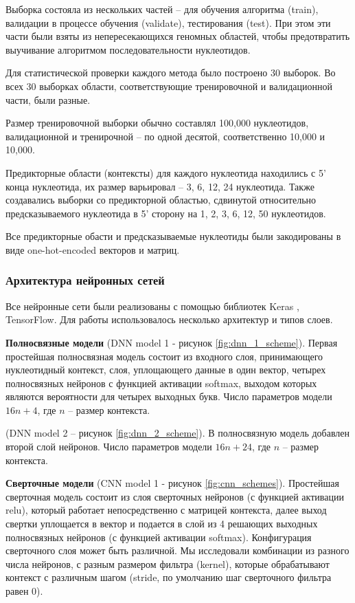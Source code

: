 Выборка состояла из нескольких частей --  для обучения алгоритма (train), валидации в процессе обучения (validate), тестирования (test). При этом эти части были взяты из непересекающихся геномных областей, чтобы предотвратить выучивание алгоритмом последовательности нуклеотидов.

Для статистической проверки каждого метода было построено 30 выборок. Во всех 30 выборках области, соответствующие тренировочной и валидационной части, были разные.

Размер тренировочной выборки обычно составлял 100,000 нуклеотидов, валидационной и тренирочной -- по одной десятой, соответственно 10,000 и 10,000.

Предикторные области (контексты) для каждого нуклеотида находились с 5' конца нуклеотида, их размер варьировал -- 3, 6, 12, 24 нуклеотида. Также создавались выборки со предикторной областью, сдвинутой относительно предсказываемого нуклеотида в 5' сторону на 1, 2, 3, 6, 12, 50 нуклеотидов.

Все предикторные обасти и предсказываемые нуклеотиды были закодированы в виде one-hot-encoded векторов и матриц.

\subsubsection{Архитектура нейронных сетей}
Все нейронные сети были реализованы с помощью библиотек Keras\cite{chollet_keras_2015} , TensorFlow.
Для работы использовалось несколько архитектур и типов слоев.



{\bfseries Полносвязные модели} (DNN model 1 - рисунок \ref{fig:dnn_1_scheme}). Первая простейшая полносвязная модель состоит из входного слоя, принимающего нуклеотидный контекст, слоя, уплощающего данные в один вектор, четырех полносвязных нейронов с функцией активации softmax, выходом которых являются вероятности для четырех выходных букв. Число параметров модели $16n + 4$, где $n$ -- размер контекста.

(DNN model 2 -- рисунок \ref{fig:dnn_2_scheme}). В полносвязную модель добавлен второй слой нейронов. Число параметров модели $16n + 24$, где $n$ -- размер контекста.


{\bfseries Сверточные модели} (CNN model 1 - рисунок \ref{fig:cnn_schemes}).
Простейшая сверточная модель состоит из слоя сверточных нейронов (с функцией активации relu), который работает непосредственно с матрицей контекста, далее выход свертки уплощается в вектор и подается в слой из 4 решающих выходных полносвязных нейронов (с функцией активации softmax). Конфигурация сверточного слоя может быть различной. Мы исследовали комбинации из разного числа нейронов, с разным размером фильтра (kernel), которые обрабатывают контекст с различным шагом (stride, по умолчанию шаг сверточного фильтра равен 0).

